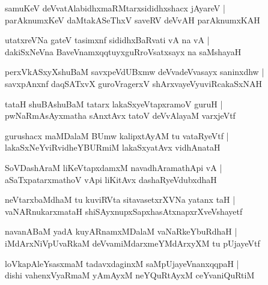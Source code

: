 \begin{shloka}
samuKeV deVvatAlabidhxmaRMtarxsididhxshacx jAyareV |\\
parAknumxKeV daMtakASeThxV saveRV deVvAH parAknumxKAH
\end{shloka}

\begin{shloka}
utatxreVNa gateV tasimxnf sididhxBaRvati vA na vA |\\
dakiSxNeVna BaveVnamxqqtuyxguRroVsatxsayx na saMshayaH 
\end{shloka}

\begin{shloka}
perxVkASxyXshuBaM savxpeVdUBxmw deVvadeVvasayx saninxdhw |\\
savxpAnxnf daqSATxvX guroVragerxV shArxvayeVyuviRcakaSxNAH 
\end{shloka}

\begin{shloka}
tataH shuBAshuBaM tatarx lakaSxyeVtapxramoV guruH |\\
pwNaRmAsAyxmatha sAnxtAvx tatoV deVvAlayaM varxjeVtf
\end{shloka}

\begin{shloka}
gurushacx maMDalaM BUmw kalipxtAyAM tu vataRyeVtf |\\
lakaSxNeYviRvidheYBURmiM lakaSxyatAvx vidhAnataH 
\end{shloka}

\begin{shloka}
SoVDashAraM liKeVtapxdamxM navadhAramathApi vA |\\
aSaTxpatarxmathoV vApi liKitAvx dashaRyeVdubxdhaH 
\end{shloka}

\begin{shloka}
neVtarxbaMdhaM tu kuviRVta sitavasetxrXVNa yatanx taH |\\
vaNARnukarxmataH shiSAyxnupxSapxhasAtxnapxrXveVshayetf
\end{shloka}

\begin{shloka}
navanABaM yadA kuyARnamxMDalaM vaNaRkeYbuRdhaH |\\
iMdArxNiVpUvaRkaM deVvamiMdarxmeYMdArxyXM tu pUjayeVtf 
\end{shloka}

\begin{shloka}
loVkapAleYsasxmaM tadavxdaginxM saMpUjayeVnanxqqpaH |\\
dishi vahenxVyaRmaM yAmAyxM neYQuRtAyxM ceYvaniQuRtiM
\end{shloka}

